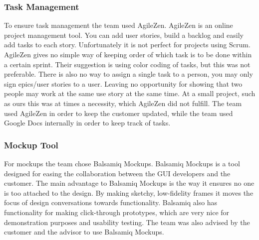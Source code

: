 % 
% 

\subsubsection{Task Management}
To ensure task management the team used AgileZen. AgileZen\cite{agilezen} is an online 
project management tool. You can add user stories, build a backlog and easily add 
tasks to each story. Unfortunately it is not perfect for projects using 
Scrum. AgileZen gives no simple way of keeping order of which task is to be done within a certain sprint. 
Their suggestion is using color coding of tasks, but this was not preferable.
There is also no way to assign a single task to a person, you may only sign epics/user stories to a user. Leaving no opportunity for showing that two people may work at the same use story at the same time. At a small project, such as ours this was at times a necessity, which AgileZen did not fulfill.
The team used AgileZen in order to keep the customer updated, while the team 
used Google Docs internally in order to keep track of tasks. 

\subsubsection{Mockup Tool}
For mockups the team chose Balsamiq Mockups. Balsamiq Mockups\cite{balsamiqmockups} is 
a tool designed for easing the collaboration between the GUI developers and the customer. 
The main advantage to Balsamiq Mockups is the way it ensures no one is too attached to the 
design. By making sketchy, low-fidelity frames it moves the focus of design conversations 
towards functionality. Balsamiq also has functionality for making click-through prototypes, 
which are very nice for demonstration purposes and usability testing. The team was also 
advised by the customer and the advisor to use Balsamiq Mockups.


